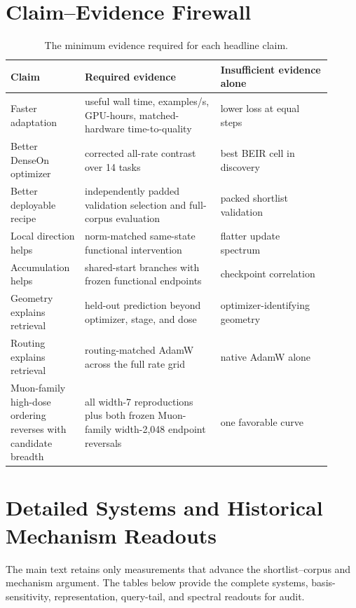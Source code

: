 \documentclass[11pt]{article}
\begin{document}


\section{Claim--Evidence Firewall}

\begin{table}[t]
\centering
\small
\begin{tabular}{p{0.20\linewidth}p{0.39\linewidth}p{0.32\linewidth}}
\toprule
Claim & Required evidence & Insufficient evidence alone \\
\midrule
Faster adaptation & useful wall time, examples/s, GPU-hours, matched-hardware time-to-quality & lower loss at equal steps \\
Better DenseOn optimizer & corrected all-rate contrast over 14 tasks & best BEIR cell in discovery \\
Better deployable recipe & independently padded validation selection and full-corpus evaluation & packed shortlist validation \\
Local direction helps & norm-matched same-state functional intervention & flatter update spectrum \\
Accumulation helps & shared-start branches with frozen functional endpoints & checkpoint correlation \\
Geometry explains retrieval & held-out prediction beyond optimizer, stage, and dose & optimizer-identifying geometry \\
Routing explains retrieval & routing-matched AdamW across the full rate grid & native AdamW alone \\
Muon-family high-dose ordering reverses with candidate breadth & all width-7 reproductions plus both frozen Muon-family width-2,048 endpoint reversals & one favorable curve \\
\bottomrule
\end{tabular}
\caption{The minimum evidence required for each headline claim.}
\label{tab:claim-firewall}
\end{table}

\section{Detailed Systems and Historical Mechanism Readouts}

The main text retains only measurements that advance the shortlist--corpus and mechanism argument.
The tables below provide the complete systems, basis-sensitivity, representation, query-tail, and
spectral readouts for audit.
\end{document}
